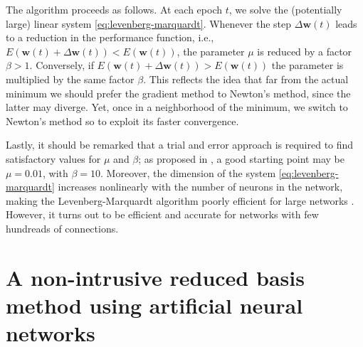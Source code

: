 \documentclass{elsarticle}
\numberwithin{equation}{section}
\theoremstyle{theorem}
\theoremstyle{definition}
\theoremstyle{remark}
\theoremstyle{proposition}
\numberwithin{figure}{section}
\begin{document}
		The algorithm proceeds as follows. At each epoch $t$, we solve the (potentially large) linear system \eqref{eq:levenberg-marquardt}. Whenever the step $\Delta \mathbf{w}(t)$ leads to a reduction in the performance function, i.e., $E(\mathbf{w}(t) + \Delta \mathbf{w}(t)) < E(\mathbf{w}(t))$, the parameter $\mu$ is reduced by a factor $\beta > 1$. Conversely, if $E(\mathbf{w}(t) + \Delta \mathbf{w}(t)) > E(\mathbf{w}(t))$ the parameter is multiplied by the same factor $\beta$. This reflects the idea that far from the actual minimum we should prefer the gradient method to Newton's method, since the latter may diverge. Yet, once in a neighborhood of the minimum, we switch to Newton's method so to exploit its faster convergence. 
		
		Lastly, it should be remarked that a trial and error approach is required to find satisfactory values for $\mu$ and $\beta$; as proposed in \cite{Mar63}, a good starting point may be $\mu = 0.01$, with $\beta = 10$. Moreover, the dimension of the system \eqref{eq:levenberg-marquardt} increases nonlinearly with the number of neurons in the network, making the Levenberg-Marquardt algorithm poorly efficient for large networks \cite{Hag94}. However, it turns out to be efficient and accurate for networks with few hundreads of connections. 		
		
		
	
	\section{A non-intrusive reduced basis method using artificial neural networks}
	\label{section:A non-intrusive RB method using neural networks}
							
\end{document}
